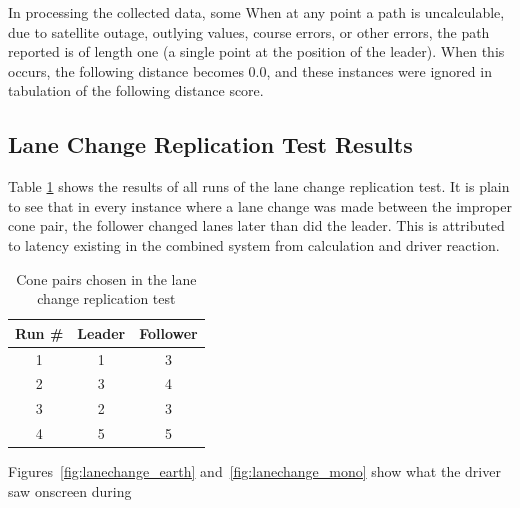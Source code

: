 In processing the collected data, some
When at any point a path is uncalculable, due to satellite outage, outlying values, course errors, or other errors, the path reported is of length one (a single point at the position of the leader). When this occurs, the following distance becomes 0.0, and these instances were ignored in tabulation of the following distance score.


\subsection{Lane Change Replication Test Results} \label{sec:lanechangetestresults}

Table \ref{tab:lanechangeresults} shows the results of all runs of the lane change replication test. It is plain to see that in every instance where a lane change was made between the improper cone pair, the follower changed lanes later than did the leader. This is attributed to latency existing in the combined system from calculation and driver reaction.

\begin{table}[htbp] \centering \caption{Cone pairs chosen in the lane change replication test}
\begin{tabular}{c|cc} 
    Run \#  &     Leader&    Follower \\ \hline\hline
    1       &       1   &    3 \\
    2       &       3   &    4   \\
    3       &       2   &    3   \\
    4       &       5   &    5 \\ \hline   
\end{tabular} \label{tab:lanechangeresults} \end{table}

Figures~\ref{fig:lanechange_earth} and~\ref{fig:lanechange_mono} show what the driver saw onscreen during 

